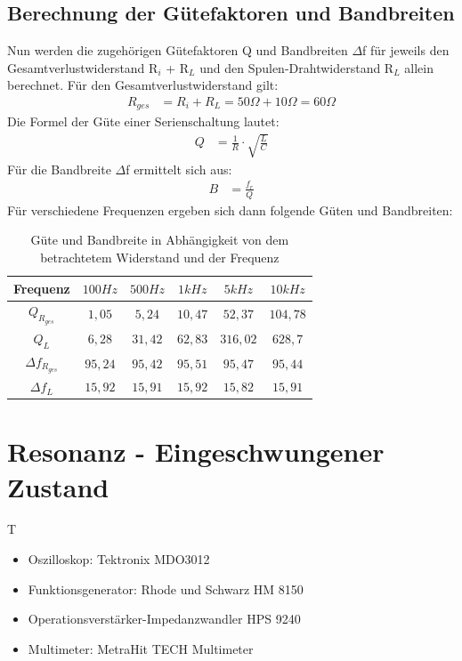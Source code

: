 \documentclass{article}
\begin{document}
\subsection{Berechnung der Gütefaktoren und Bandbreiten}
Nun werden die zugehörigen Gütefaktoren Q und Bandbreiten $\Delta$f für jeweils den Gesamtverlustwiderstand R$_i$ + R$_L$ und den Spulen-Drahtwiderstand R$_L$ allein berechnet.
Für den Gesamtverlustwiderstand gilt:
\begin{align*}
  R_{ges} & = R_i + R_L= 50\Omega + 10\Omega = 60\Omega
\end{align*}
Die Formel der Güte einer Serienschaltung lautet:
\begin{align*}
  Q & = \frac{1}{R}\cdot\sqrt{\frac{L}{C}}
\end{align*}
Für die Bandbreite $\Delta$f ermittelt sich aus:
\begin{align*}
  B & = \frac{f_r}{Q}
\end{align*}
Für verschiedene Frequenzen ergeben sich dann folgende Güten und Bandbreiten:
\begin{table}[h]

  \begin{center}

    \begin{tabular}{|c|c|c|c|c|c|}
      \hline
      Frequenz             & $100Hz$ & $500Hz$ & $1kHz$  & $5kHz$   & $10kHz$  \\
      \hline
      $Q_{R_{ges}}$        & $1,05$  & $5,24$  & $10,47$ & $52,37$  & $104,78$ \\
      \hline
      $Q_L$                & $6,28$  & $31,42$ & $62,83$ & $316,02$ & $628,7$  \\
      \hline
      $\Delta f_{R_{ges}}$ & $95,24$ & $95,42$ & $95,51$ & $95,47$  & $95,44$  \\
      \hline
      $\Delta f_L$         & $15,92$ & $15,91$ & $15,92$ & $15,82$  & $15,91$  \\
      \hline
    \end{tabular}
    \caption{Güte und Bandbreite in Abhängigkeit von dem betrachtetem Widerstand und der Frequenz}
    \label{tab:cGB}
  \end{center}
\end{table}




\newpage

\section{Resonanz - Eingeschwungener Zustand}
\begin{devlist}
  T
  \begin{itemize}
    \item Oszilloskop: Tektronix MDO3012
    \item Funktionsgenerator: Rhode und Schwarz HM 8150
    \item Operationsverstärker-Impedanzwandler HPS 9240
    \item Multimeter: MetraHit TECH Multimeter
  \end{itemize}
\end{devlist}
\end{document}
